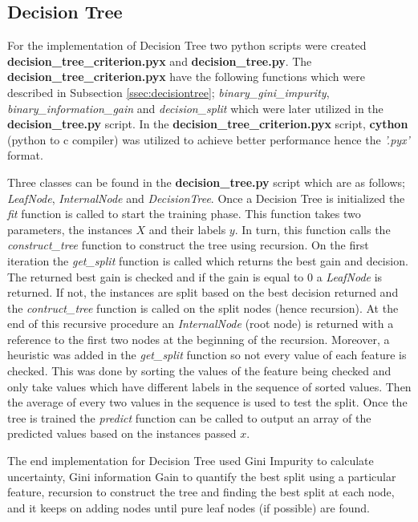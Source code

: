 \subsection{Decision Tree}\label{ssec:impldt}
For the implementation of Decision Tree two python scripts were created \textbf{decision\_tree\_criterion.pyx} and \textbf{decision\_tree.py}. The \textbf{decision\_tree\_criterion.pyx} have the following functions which were described in Subsection \ref{ssec:decisiontree}; \textit{binary\_gini\_impurity}, \textit{binary\_information\_gain} and \textit{decision\_split} which were later utilized in the \textbf{decision\_tree.py} script. In the \textbf{decision\_tree\_criterion.pyx} script, \textbf{cython} \cite{behnel2010cython} (python to c compiler) was utilized to achieve better performance hence the \textit{'.pyx'} format.  

\noindent Three classes can be found in the \textbf{decision\_tree.py} script which are as follows; \textit{LeafNode}, \textit{InternalNode} and \textit{DecisionTree}. Once a Decision Tree is initialized the \textit{fit} function is called to start the training phase. This function takes two parameters, the instances $X$ and their labels $y$. In turn, this function calls the \textit{construct\_tree} function to construct the tree using recursion. On the first iteration the \textit{get\_split} function is called which returns the best gain and decision. The returned best gain is checked and if the gain is equal to 0 a \textit{LeafNode} is returned. If not, the instances are split based on the best decision returned and the \textit{contruct\_tree} function is called on the split nodes (hence recursion). At the end of this recursive procedure an \textit{InternalNode} (root node) is returned with a reference to the first two nodes at the beginning of the recursion. Moreover, a heuristic was added in the \textit{get\_split} function so not every value of each feature is checked. This was done by sorting the values of the feature being checked and only take values which have different labels in the sequence of sorted values. Then the average of every two values in the sequence is used to test the split. Once the tree is trained the \textit{predict} function can be called to output an array of the predicted values based on the instances passed $x$.

\noindent The end implementation for Decision Tree used Gini Impurity to calculate uncertainty, Gini information Gain to quantify the best split using a particular feature, recursion to construct the tree and finding the best split at each node, and it keeps on adding nodes until pure leaf nodes (if possible) are found.